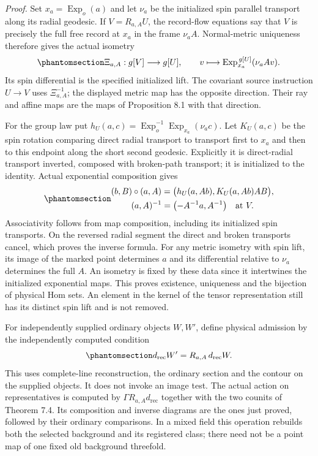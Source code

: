\documentclass[
  english,
  11pt,
  reqno]{amsart}
\begin{document}
\emph{Proof.} Set \(x_a=\operatorname{Exp}_o(a)\) and let \(\nu_a\) be
the initialized spin parallel transport along its radial geodesic. If
\(V=R_{a,A}U\), the record-flow equations say that \(V\) is precisely
the full free record at \(x_a\) in the frame \(\nu_a A\). Normal-metric
uniqueness therefore gives the actual isometry
\begin{equation}\protect\phantomsection\label{eq:gg-physical-arrow-normal-isometry}{
 \Xi_{a,A}:g[V]\longrightarrow g[U],\qquad
 v\longmapsto
 \operatorname{Exp}_{x_a}^{\,g[U]}(\nu_a A v).
}\end{equation} Its spin differential is the specified initialized lift.
The covariant source instruction \(U\to V\) uses \(\Xi_{a,A}^{-1}\); the
displayed metric map has the opposite direction. Their ray and affine
maps are the maps of Proposition 8.1 with that direction.

For the group law put \(h_U(a,c)=\operatorname{Exp}_o^{-1}
 \operatorname{Exp}_{x_a}(\nu_ac)\). Let \(K_U(a,c)\) be the spin
rotation comparing direct radial transport to transport first to \(x_a\)
and then to this endpoint along the short second geodesic. Explicitly it
is direct-radial transport inverted, composed with broken-path
transport; it is initialized to the identity. Actual exponential
composition gives
\begin{equation}\protect\phantomsection\label{eq:gg-source-physical-composition}{\begin{gathered}
(b,B)\circ(a,A)=
   \bigl(h_U(a,Ab),K_U(a,Ab)AB\bigr), \\
(a,A)^{-1}=\bigl(-A^{-1}a,A^{-1}\bigr)\quad\text{at }V.
\end{gathered}}\end{equation} Associativity follows from map composition, including
its initialized spin transports. On the reversed radial segment the
direct and broken transports cancel, which proves the inverse formula.
For any metric isometry with spin lift, its image of the marked point
determines \(a\) and its differential relative to \(\nu_a\) determines
the full \(A\). An isometry is fixed by these data since it intertwines
the initialized exponential maps. This proves existence, uniqueness and
the bijection of physical Hom sets. An element in the kernel of the
tensor representation still has its distinct spin lift and is not
removed.

For independently supplied ordinary objects \(W,W'\), define physical
admission by the independently computed condition
\begin{equation}\protect\phantomsection\label{eq:gg-independent-ordinary-physical-admission}{
 d_{\mathrm{rec}}W'=R_{a,A}\,d_{\mathrm{rec}}W .
}\end{equation} This uses complete-line reconstruction, the ordinary
section and the contour on the supplied objects. It does not invoke an
image test. The actual action on representatives is computed by
\(\Gamma R_{a,A}d_{\mathrm{rec}}\) together with the two counits of
Theorem 7.4. Its composition and inverse diagrams are the ones just
proved, followed by their ordinary comparisons. In a mixed field this
operation rebuilds both the selected background and its registered
class; there need not be a point map of one fixed old background
threefold.
\end{document}
